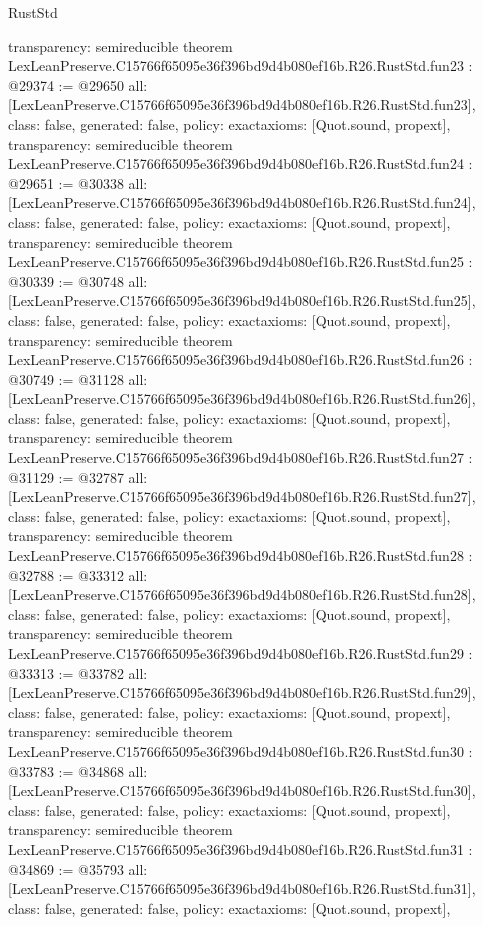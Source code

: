 \begin{lexlean}{RustStd}
\begin{coremodule}
{  transparency: semireducible
}
theorem LexLeanPreserve.C15766f65095e36f396bd9d4b080ef16b.R26.RustStd.fun23 : @29374 := @29650 {
  all: [LexLeanPreserve.C15766f65095e36f396bd9d4b080ef16b.R26.RustStd.fun23],
  class: false,
  generated: false,
  policy: exact{axioms: [Quot.sound, propext]},
  transparency: semireducible
}
theorem LexLeanPreserve.C15766f65095e36f396bd9d4b080ef16b.R26.RustStd.fun24 : @29651 := @30338 {
  all: [LexLeanPreserve.C15766f65095e36f396bd9d4b080ef16b.R26.RustStd.fun24],
  class: false,
  generated: false,
  policy: exact{axioms: [Quot.sound, propext]},
  transparency: semireducible
}
theorem LexLeanPreserve.C15766f65095e36f396bd9d4b080ef16b.R26.RustStd.fun25 : @30339 := @30748 {
  all: [LexLeanPreserve.C15766f65095e36f396bd9d4b080ef16b.R26.RustStd.fun25],
  class: false,
  generated: false,
  policy: exact{axioms: [Quot.sound, propext]},
  transparency: semireducible
}
theorem LexLeanPreserve.C15766f65095e36f396bd9d4b080ef16b.R26.RustStd.fun26 : @30749 := @31128 {
  all: [LexLeanPreserve.C15766f65095e36f396bd9d4b080ef16b.R26.RustStd.fun26],
  class: false,
  generated: false,
  policy: exact{axioms: [Quot.sound, propext]},
  transparency: semireducible
}
theorem LexLeanPreserve.C15766f65095e36f396bd9d4b080ef16b.R26.RustStd.fun27 : @31129 := @32787 {
  all: [LexLeanPreserve.C15766f65095e36f396bd9d4b080ef16b.R26.RustStd.fun27],
  class: false,
  generated: false,
  policy: exact{axioms: [Quot.sound, propext]},
  transparency: semireducible
}
theorem LexLeanPreserve.C15766f65095e36f396bd9d4b080ef16b.R26.RustStd.fun28 : @32788 := @33312 {
  all: [LexLeanPreserve.C15766f65095e36f396bd9d4b080ef16b.R26.RustStd.fun28],
  class: false,
  generated: false,
  policy: exact{axioms: [Quot.sound, propext]},
  transparency: semireducible
}
theorem LexLeanPreserve.C15766f65095e36f396bd9d4b080ef16b.R26.RustStd.fun29 : @33313 := @33782 {
  all: [LexLeanPreserve.C15766f65095e36f396bd9d4b080ef16b.R26.RustStd.fun29],
  class: false,
  generated: false,
  policy: exact{axioms: [Quot.sound, propext]},
  transparency: semireducible
}
theorem LexLeanPreserve.C15766f65095e36f396bd9d4b080ef16b.R26.RustStd.fun30 : @33783 := @34868 {
  all: [LexLeanPreserve.C15766f65095e36f396bd9d4b080ef16b.R26.RustStd.fun30],
  class: false,
  generated: false,
  policy: exact{axioms: [Quot.sound, propext]},
  transparency: semireducible
}
theorem LexLeanPreserve.C15766f65095e36f396bd9d4b080ef16b.R26.RustStd.fun31 : @34869 := @35793 {
  all: [LexLeanPreserve.C15766f65095e36f396bd9d4b080ef16b.R26.RustStd.fun31],
  class: false,
  generated: false,
  policy: exact{axioms: [Quot.sound, propext]},
}
\end{coremodule}
\end{lexlean}
